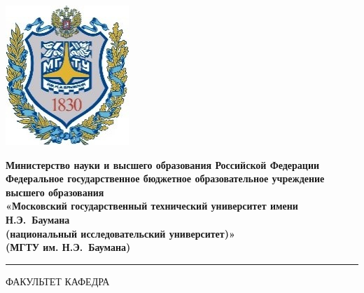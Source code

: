 \documentclass[12pt]{report}
\begin{document}
\begin{titlepage}
	\fontsize{12pt}{12pt}\selectfont
	\noindent \begin{minipage}{0.15\textwidth}
		\includegraphics[width=\linewidth]{inc/img/b_logo.jpg}
	\end{minipage}
	\noindent\begin{minipage}{0.9\textwidth}\centering
		\textbf{Министерство науки и высшего образования Российской Федерации}\\
		\textbf{Федеральное государственное бюджетное образовательное учреждение высшего образования}\\
		\textbf{«Московский государственный технический университет имени Н.Э.~Баумана}\\
		\textbf{(национальный исследовательский университет)»}\\
		\textbf{(МГТУ им. Н.Э.~Баумана)}
	\end{minipage}
	
	\noindent\rule{15cm}{3pt}
	\newline\newline
	\noindent ФАКУЛЬТЕТ \underline{} \newline\newline
	\noindent КАФЕДРА \underline{}\newline\newline\newline\newline\newline\newline\newline
	

\end{titlepage}
\end{document}
